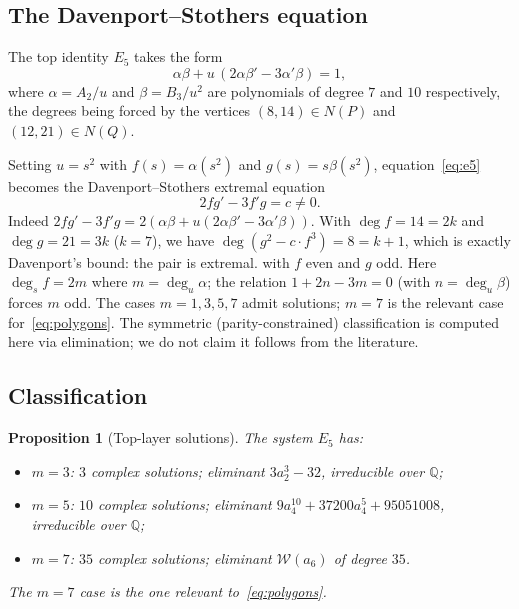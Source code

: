 \documentclass[a4paper,11pt]{article}
\theoremstyle{plain}
\newtheorem{proposition}[theorem]{Proposition}
\theoremstyle{definition}
\theoremstyle{remark}
\begin{document}
\subsection{The Davenport--Stothers equation}

The top identity $E_5$ takes the form
\begin{equation}\label{eq:e5}
\alpha\beta+u\,(2\alpha\beta'-3\alpha'\beta)=1,
\end{equation}
where $\alpha=A_2/u$ and $\beta=B_3/u^2$ are polynomials of degree $7$ and $10$ respectively, the degrees being forced by the vertices $(8,14)\in N(P)$ and $(12,21)\in N(Q)$.

Setting $u=s^2$ with $f(s)=\alpha(s^2)$ and $g(s)=s\beta(s^2)$, equation~\eqref{eq:e5} becomes the Davenport--Stothers extremal equation~\cite{Stothers,Davenport}
\begin{equation}
2fg'-3f'g=c\neq0.
\end{equation}
Indeed $2fg'-3f'g=2(\alpha\beta+u(2\alpha\beta'-3\alpha'\beta))$. With $\deg f=14=2k$ and $\deg g=21=3k$ ($k=7$), we have $\deg(g^2-c\cdot f^3)=8=k+1$, which is exactly Davenport's bound: the pair is extremal.
with $f$ even and $g$ odd. Here $\deg_s f = 2m$ where $m=\deg_u\alpha$; the relation $1+2n-3m=0$ (with $n=\deg_u\beta$) forces $m$ odd. The cases $m=1,3,5,7$ admit solutions; $m=7$ is the relevant case for~\eqref{eq:polygons}. The symmetric (parity-constrained) classification is computed here via elimination; we do not claim it follows from the literature.

\subsection{Classification}

\begin{proposition}[Top-layer solutions]\label{prop:top-class}
The system $E_5$ has:
\begin{itemize}[nosep]
\item $m=3$: $3$ complex solutions; eliminant $3a_2^3-32$, irreducible over $\mathbb{Q}$;
\item $m=5$: $10$ complex solutions; eliminant $9a_4^{10}+37200a_4^5+95051008$, irreducible over $\mathbb{Q}$;
\item $m=7$: $35$ complex solutions; eliminant $\mathcal{W}(a_6)$ of degree $35$.
\end{itemize}
The $m=7$ case is the one relevant to~\eqref{eq:polygons}.
\end{proposition}
\end{document}
